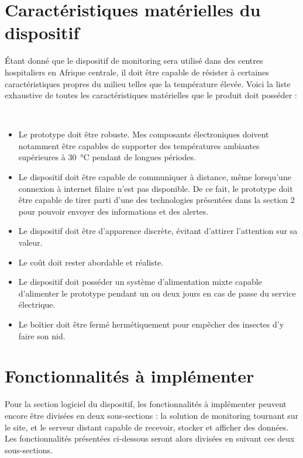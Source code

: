 \section{Caractéristiques matérielles du dispositif}
\label{sec:cahier_proto}

Étant donné que le dispositif de monitoring sera utilisé dans des centres hospitaliers en Afrique centrale, il doit être capable de résister à certaines caractéristiques propres du milieu telles que la température élevée. Voici la liste exhaustive de toutes les caractéristiques matérielles que le produit doit posséder :

~


\begin{itemize}
  \item Le prototype doit être robuste. Mes composants électroniques doivent notamment être capables de supporter des températures ambiantes supérieures à \SI{30}{\celsius} pendant de longues périodes. \cite{temperature_kinshasa}

  \item Le dispositif doit être capable de communiquer à distance, même lorsqu'une connexion à internet filaire n'est pas disponible. De ce fait, le prototype doit être capable de tirer parti d'une des technologies présentées dans la section 2 pour pouvoir envoyer des informations et des alertes.

  \item Le dispositif doit être d'apparence discrète, évitant d'attirer l'attention sur sa valeur.

  \item Le coût doit rester abordable et réaliste.

  \item Le dispositif doit posséder un système d'alimentation mixte capable d'alimenter le prototype pendant un ou deux jours en cas de passe du service électrique.

  \item Le boîtier doit être fermé hermétiquement pour empêcher des insectes d'y faire son nid.
\end{itemize}



\section{Fonctionnalités à implémenter}
\label{sec:cahier_soft}

Pour la section logiciel du dispositif, les fonctionnalités à implémenter peuvent encore être divisées en deux sous-sections : la solution de monitoring tournant sur le site, et le serveur distant capable de recevoir, stocker et afficher des données. Les fonctionnalités présentées ci-dessous seront alors divisées en suivant ces deux sous-sections.

